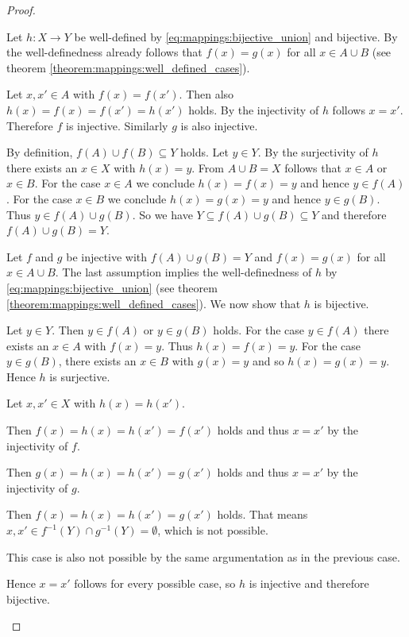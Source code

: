 \begin{proof}
    \begin{proofenumerate}
         Let $h\colon X\rightarrow Y$ be well-defined by \eqref{eq:mappings:bijective_union} and bijective. By the well-definedness already follows that $f(x)=g(x)$ for all $x\in A\cup B$ (see theorem \ref{theorem:mappings:well_defined_cases}).

        Let $x,x'\in A$ with $f(x)=f(x')$. Then also $h(x)=f(x)=f(x')=h(x')$ holds. By the injectivity of $h$ follows $x=x'$. Therefore $f$ is injective. Similarly $g$ is also injective.

        By definition, $f(A)\cup f(B)\subseteq Y$ holds. Let $y\in Y$. By the surjectivity of $h$ there exists an $x\in X$ with $h(x)=y$. From $A\cup B=X$ follows that $x\in A$ or $x\in B$. For the case $x\in A$ we conclude $h(x)=f(x)=y$ and hence $y\in f(A)$. For the case $x\in B$ we conclude $h(x)=g(x)=y$ and hence $y\in g(B)$. Thus $y\in f(A)\cup g(B)$. So we have $Y\subseteq f(A)\cup g(B)\subseteq Y$ and therefore $f(A)\cup g(B)=Y$.

         Let $f$ and $g$ be injective with $f(A)\cup g(B)=Y$ and $f(x)=g(x)$ for all $x\in A\cup B$. The last assumption implies the well-definedness of $h$ by \eqref{eq:mappings:bijective_union} (see theorem \ref{theorem:mappings:well_defined_cases}). We now show that $h$ is bijective.

        Let $y\in Y$. Then $y\in f(A)$ or $y\in g(B)$ holds. For the case $y\in f(A)$ there exists an $x\in A$ with $f(x)=y$. Thus $h(x)=f(x)=y$. For the case $y\in g(B)$, there exists an $x\in B$ with $g(x)=y$ and so $h(x)=g(x)=y$. Hence $h$ is surjective.

        Let $x,x'\in X$ with $h(x)=h(x')$.
        
         Then $f(x)=h(x)=h(x')=f(x')$ holds and thus $x=x'$ by the injectivity of $f$.
        
         Then $g(x)=h(x)=h(x')=g(x')$ holds and thus $x=x'$ by the injectivity of $g$.
        
         Then $f(x)=h(x)=h(x')=g(x')$ holds. That means $x,x'\in f^{-1}(Y)\cap g^{-1}(Y)=\emptyset$, which is not possible.

         This case is also not possible by the same argumentation as in the previous case.

        Hence $x=x'$ follows for every possible case, so $h$ is injective and therefore bijective.
    \end{proofenumerate}
\end{proof}

